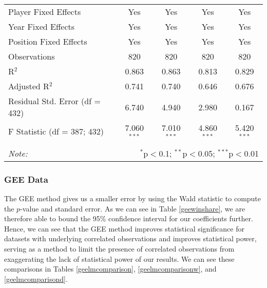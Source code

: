 \documentclass[12pt]{article}
\begin{document}
\begin{landscape}
\begin{table}[!htbp]
\begin{tabular}{@{\extracolsep{5pt}}lcccc}
				Player Fixed Effects & Yes & Yes & Yes & Yes \\ 
				Year Fixed Effects & Yes & Yes & Yes & Yes \\ 
				Position Fixed Effects & Yes & Yes & Yes & Yes \\ 
				Observations & 820 & 820 & 820 & 820 \\ 
				R$^{2}$ & 0.863 & 0.863 & 0.813 & 0.829 \\ 
				Adjusted R$^{2}$ & 0.741 & 0.740 & 0.646 & 0.676 \\ 
				Residual Std. Error (df = 432) & 6.740 & 4.940 & 2.980 & 0.167 \\ 
				F Statistic (df = 387; 432) & 7.060$^{***}$ & 7.010$^{***}$ & 4.860$^{***}$ & 5.420$^{***}$ \\ 
				\hline 
				\hline \\[-1.8ex] 
				\textit{Note:}  & \multicolumn{4}{r}{$^{*}$p$<$0.1; $^{**}$p$<$0.05; $^{***}$p$<$0.01} \\ 
			\end{tabular} 
		\end{table}
	\end{landscape}
	

	\subsubsection{GEE Data}
	
	The GEE method gives us a smaller error by using the Wald statistic to compute the $p$-value and standard error. As we can see in Table \ref{geewinshare}, we are therefore able to bound the 95\% confidence interval for our coefficients further. Hence, we can see that the GEE method improves statistical significance for datasets with underlying correlated observations and improves statistical power, serving as a method to limit the presence of correlated observations from exaggerating the lack of statistical power of our results. We can see these comparisons in Tables \ref{geelmcomparison}, \ref{geelmcomparisonw}, and \ref{geelmcomparisond}.
	
\end{document}
